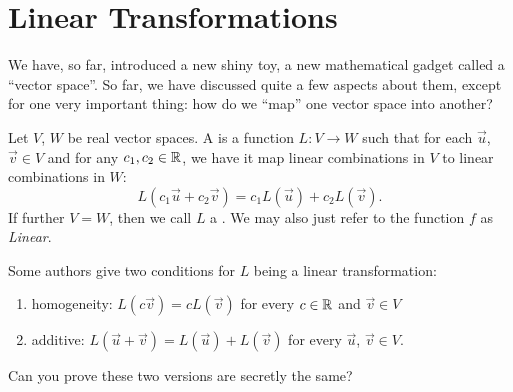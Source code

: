 \section{Linear Transformations}

\M
We have, so far, introduced a new shiny toy, a new mathematical gadget
called a ``vector space''. So far, we have discussed quite a few aspects
about them, except for one very important thing: how do we ``map'' one
vector space into another?

\begin{definition}
Let $V$, $W$ be real vector spaces.
A  is a function $L\colon V\to W$ such
that for each $\vec{u}$, $\vec{v}\in V$ and for any $c_{1},c_{2}\in\mathbb{R}$,
we have it map linear combinations in $V$ to linear combinations in $W$: 
\begin{equation}
L(c_{1}\vec{u} + c_{2}\vec{v}) = c_{1}L(\vec{u}) + c_{2}L(\vec{v}).
\end{equation}
If further $V=W$, then we call $L$ a .
We may also just refer to the function $f$ as \emph{Linear}.
\end{definition}

\begin{remark}
  Some authors give two conditions for $L$ being a linear transformation:
  \begin{enumerate}
  \item homogeneity: $L(c\vec{v})=cL(\vec{v})$ for every $c\in\mathbb{R}$ and
    $\vec{v}\in V$
  \item additive: $L(\vec{u}+\vec{v})=L(\vec{u})+L(\vec{v})$ for every
    $\vec{u}$, $\vec{v}\in V$.
  \end{enumerate}
  Can you prove these two versions are secretly the same?
\end{remark}

